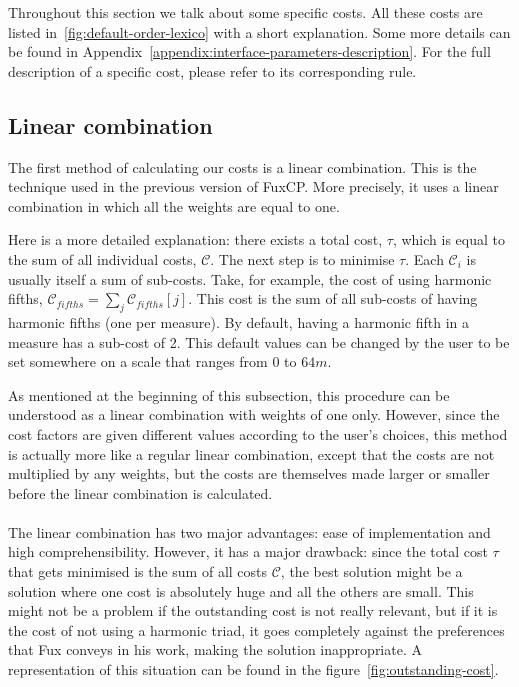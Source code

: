 Throughout this section we talk about some specific costs. All these costs are listed in~\ref{fig:default-order-lexico} with a short explanation. Some more details can be found in Appendix~\ref{appendix:interface-parameters-description}. For the full description of a specific cost, please refer to its corresponding rule. 


\subsection{Linear combination}


The first method of calculating our costs is a linear combination. This is the technique used in the previous version of FuxCP. More precisely, it uses a linear combination in which all the weights are equal to one.



Here is a more detailed explanation: there exists a total cost, $\tau$, which is equal to the sum of all individual costs, $\mathcal{C}$. The next step is to minimise $\tau$. Each $\mathcal{C}_i$ is usually itself a sum of sub-costs. Take, for example, the cost of using harmonic fifths, $\mathcal{C}_{\mathit{fifths}}=\sum_j \mathcal{C}_{\mathit{fifths}}[j]$. This cost is the sum of all sub-costs of having harmonic fifths (one per measure). By default, having a harmonic fifth in a measure has a sub-cost of 2. This default values can be changed by the user to be set somewhere on a scale that ranges from $0$ to $64m$.

As mentioned at the beginning of this subsection, this procedure can be understood as a linear combination with weights of one only. However, since the cost factors are given different values according to the user's choices, this method is actually more like a regular linear combination, except that the costs are not multiplied by any weights, but the costs are themselves made larger or smaller before the linear combination is calculated.

\paragraph{}
The linear combination has two major advantages: ease of implementation and high comprehensibility.
However, it has a major drawback: since the total cost $\tau$ that gets minimised is the sum of all costs $\mathcal{C}$, the best solution might be a solution where one cost is absolutely huge and all the others are small. This might not be a problem if the outstanding cost is not really relevant, but if it is the cost of not using a harmonic triad, it goes completely against the preferences that Fux conveys in his work, making the solution inappropriate. A representation of this situation can be found in the figure~\ref{fig:outstanding-cost}.

